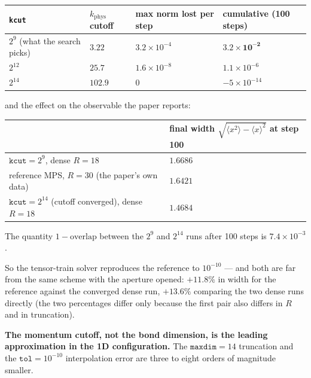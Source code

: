 \documentclass[11pt,a4paper]{article}
\newcommand{\code}[1]{\texttt{#1}}
\newcommand{\kph}{k_{\mathrm{phys}}}
\begin{document}
\begin{center}
\begin{tabular}{@{}llll@{}}
\toprule
\code{kcut} & $\kph$ cutoff & max norm lost per step & cumulative (100 steps) \\
\midrule
$2^9$ (what the search picks) & $3.22$  & $3.2\times10^{-4}$ & $\mathbf{3.2\times10^{-2}}$ \\
$2^{12}$                      & $25.7$  & $1.6\times10^{-8}$ & $1.1\times10^{-6}$ \\
$2^{14}$                      & $102.9$ & $0$                & $-5\times10^{-14}$ \\
\bottomrule
\end{tabular}
\end{center}

\noindent
and the effect on the observable the paper reports:

\begin{center}
\begin{tabular}{@{}ll@{}}
\toprule
 & final width $\sqrt{\langle x^2\rangle - \langle x\rangle^2}$ at step 100 \\
\midrule
$\code{kcut} = 2^9$, dense $R = 18$                    & $1.6686$ \\
reference MPS, $R = 30$ (the paper's own data)         & $1.6421$ \\
$\code{kcut} = 2^{14}$ (cutoff converged), dense $R=18$ & $\mathbf{1.4684}$ \\
\bottomrule
\end{tabular}
\end{center}

\noindent
The quantity $1 - \text{overlap}$ between the $2^9$ and $2^{14}$ runs after 100 steps
is $7.4\times 10^{-3}$.

So the tensor-train solver reproduces the reference to $10^{-10}$ --- and both are
far from the same scheme with the aperture opened: $+11.8\%$ in width for the
reference against the converged dense run, $+13.6\%$ comparing the two dense runs
directly (the two percentages differ only because the first pair also differs in $R$
and in truncation).

\begin{finding}
\textbf{The momentum cutoff, not the bond dimension, is the leading approximation in
the 1D configuration.} The $\code{maxdim} = 14$ truncation and the
$\code{tol} = 10^{-10}$ interpolation error are three to eight orders of magnitude
smaller.
\end{finding}
\end{document}

